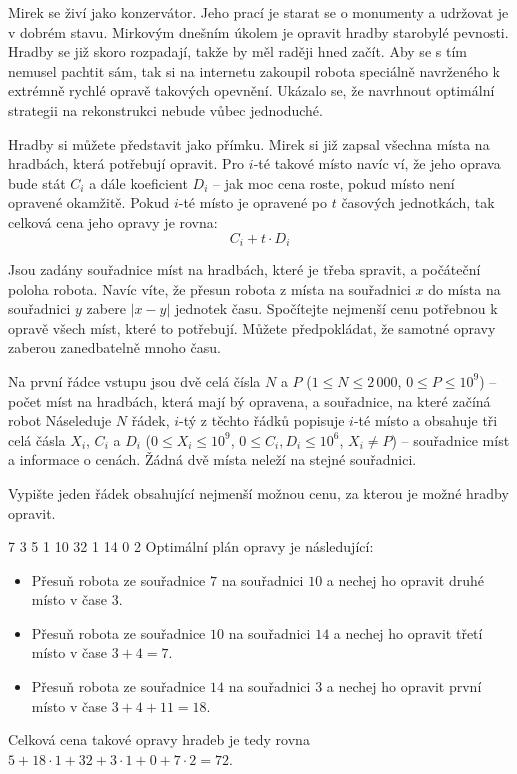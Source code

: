 





Mirek se živí jako konzervátor.
Jeho prací je starat se o monumenty a udržovat je v dobrém stavu.
Mirkovým dnešním úkolem je opravit hradby starobylé pevnosti.
Hradby se již skoro rozpadají, takže by měl raději hned začít.
Aby se s tím nemusel pachtit sám, tak si na internetu zakoupil robota
speciálně navrženého k extrémně rychlé opravě takových opevnění.
Ukázalo se, že navrhnout optimální strategii na rekonstrukci nebude vůbec jednoduché.

Hradby si můžete představit jako přímku.
Mirek si již zapsal všechna místa na hradbách, která potřebují opravit.
Pro $i$-té takové místo navíc ví, že jeho oprava bude stát $C_i$
a dále koeficient $D_i$ -- jak moc cena roste, pokud místo není opravené okamžitě.
Pokud $i$-té místo je opravené po $t$ časových jednotkách,
tak celková cena jeho opravy je rovna:
\[ C_i + t \cdot D_i \]


Jsou zadány souřadnice míst na hradbách, které je třeba spravit,
a počáteční poloha robota.
Navíc víte, že přesun robota z místa na souřadnici $x$ do místa na souřadnici $y$
zabere $|x - y|$ jednotek času.
Spočítejte nejmenší cenu potřebnou k opravě všech míst, které to potřebují.
Můžete předpokládat, že samotné opravy zaberou zanedbatelně mnoho času.


Na první řádce vstupu jsou dvě celá čísla $N$ a $P$
($1 \le N \le 2\,000$, $0 \le P \le 10^9$)
-- počet míst na hradbách, která mají bý opravena, a souřadnice,
na které začíná robot
Náseleduje $N$ řádek, $i$-tý z těchto řádků popisuje $i$-té místo
a obsahuje tři celá čásla $X_i$, $C_i$ a $D_i$
($0 \le X_i \le 10^9$, $0 \le C_i, D_i \le 10^6$, $X_i \neq P$)
-- souřadnice míst a informace o cenách.
Žádná dvě místa neleží na stejné souřadnici.


Vypište jeden řádek obsahující nejmenší možnou cenu,
za kterou je možné hradby opravit.



 7
3 5 1
10 32 1
14 0 2
\sampleCOMMENT
Optimální plán opravy je následující:
\begin{itemize}
	\item Přesuň robota ze souřadnice $7$ na souřadnici $10$ a nechej ho opravit druhé místo v čase $3$.
	\item Přesuň robota ze souřadnice $10$ na souřadnici $14$ a nechej ho opravit třetí místo v čase $3 + 4 = 7$.
	\item Přesuň robota ze souřadnice $14$ na souřadnici $3$ a nechej ho opravit první místo v čase $3 + 4 + 11 = 18$.
\end{itemize}
Celková cena takové opravy hradeb je tedy rovna\\
$5 + 18 \cdot 1 + 32 + 3 \cdot 1 + 0 + 7 \cdot 2 = 72$.
\sampleEND


